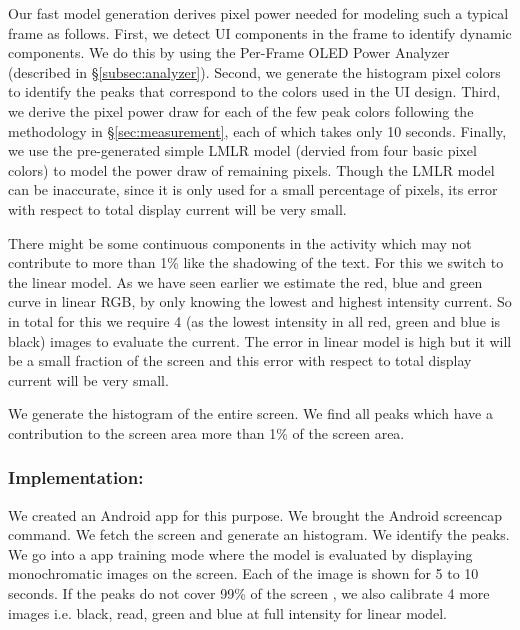 Our fast model generation derives pixel power needed for modeling such
a typical frame as follows. First, we detect UI components in the frame to
identify dynamic components. We do this by using the Per-Frame OLED Power 
Analyzer (described in \S\ref{subsec:analyzer}).  Second, we generate the histogram
pixel colors to identify the peaks that correspond to the colors used
in the UI design. Third, we derive the pixel power draw for each of the few peak colors
following the methodology in \S\ref{sec:measurement},
each of which takes only 10 seconds. Finally,
we use the pre-generated simple LMLR model (dervied from four basic pixel colors)
to model the power draw of remaining pixels.
Though the LMLR model can be inaccurate, since it is only used for a small percentage of pixels,
its error with respect to total display current will be very small.

\fi



There might be some continuous components in the activity which may not contribute
to more than 1\% like the shadowing of the text. For this we switch to the linear model.
As we have seen earlier we estimate the red, blue and green curve in linear RGB,
by only knowing the lowest and highest intensity current. So in total for this we
require 4 (as the lowest intensity in all red, green and blue is black) images to evaluate the current.
The error in linear model is high but it will be a small fraction of the screen and
this error with respect to total display current will be very small.

We generate the histogram of the entire screen. We find all peaks which have
a contribution to the screen area more than 1\% of the screen area.
\fi

\subsubsection{Implementation:}
We created an Android app for this purpose.
We brought the Android screencap command. We fetch
the screen and generate an histogram.
We identify the peaks. We go into a app training mode where the model is evaluated
by displaying monochromatic images on the screen. Each of the image is shown for 5 to 10
seconds.
If the peaks do not cover 99\% of the screen , we also calibrate 4 more images i.e.
black, read, green and blue at full intensity for linear model.
\fi


